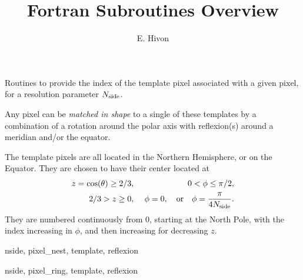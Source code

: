 
\sloppy


\title{\healpix Fortran Subroutines Overview}
 \section[template\_pixel\_nest, template\_pixel\_ring]{ }
\label{sub:template_pixel_xxx}
\author{E. Hivon}

\begin{facility}
{Routines to provide the index of the template pixel associated with a given
  \healpix pixel, for a resolution parameter ${N_{\rm side}}$. 

Any pixel can be {\em matched in shape}
  to a single of these templates by a combination of  a rotation around the polar axis with 
  reflexion(s) around a meridian and/or the equator. 

The template pixels are all located in the Northern Hemisphere, or on the
 Equator.
They are chosen to have their center located at
\begin{eqnarray}
     z=\cos(\theta)\ge 2/3,  &\ &    0< \phi \leq \pi/2,   \nonumber\\            %
     2/3 > z \geq 0,  &\ & \phi=0, \quad{\rm or}\quad  \phi=\frac{\pi}{4\nside}.  \nonumber %
\myhtmlimage{}
\end{eqnarray}
 They are numbered continuously from 0, starting at the North Pole, with the index
 increasing in $\phi$, and then increasing for decreasing $z$.
}
{\modPixTools}
\end{facility}

\begin{f90format}
{nside, pixel\_nest, template, reflexion}
\end{f90format}
\begin{f90format}
{nside, pixel\_ring, template, reflexion}
\end{f90format}

